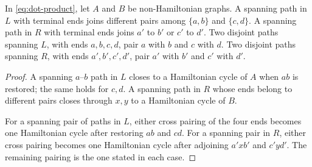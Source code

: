 \documentclass[justified,notoc,twoside,nobib,nofonts]{tufte-handout}
\begin{document}
\begin{lemma}\label{lem:boundary}
In \eqref{eq:dot-product}, let $A$ and $B$ be non-Hamiltonian graphs.
A spanning path in $L$ with terminal ends joins different pairs among
$\{a,b\}$ and $\{c,d\}$. A spanning path in $R$ with terminal ends
joins $a'$ to $b'$ or $c'$ to $d'$.
Two disjoint paths spanning $L$, with ends $a,b,c,d$, pair $a$ with $b$
and $c$ with $d$. Two disjoint paths spanning $R$, with ends
$a',b',c',d'$, pair $a'$ with $b'$ and $c'$ with $d'$.
\end{lemma}
\begin{proof}
A spanning $a$--$b$ path in $L$ closes to a Hamiltonian cycle of $A$
when $ab$ is restored; the same holds for $c,d$. A spanning path in
$R$ whose ends belong to different pairs closes through $x,y$ to a
Hamiltonian cycle of $B$.

For a spanning pair of paths in $L$, either cross pairing of the four
ends becomes one Hamiltonian cycle after restoring $ab$ and $cd$.
For a spanning pair in $R$, either cross pairing becomes one
Hamiltonian cycle after adjoining $a'xb'$ and $c'yd'$.
The remaining pairing is the one stated in each case.
\end{proof}
\end{document}
